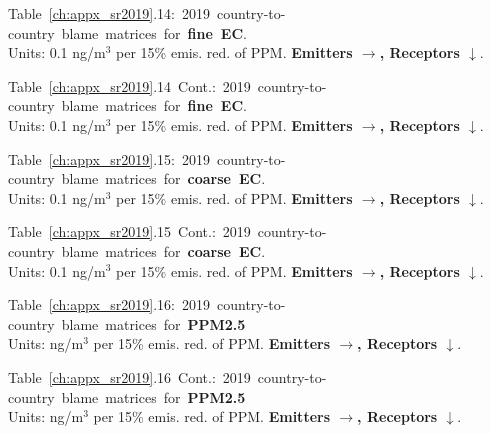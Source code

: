  \footnotesize{\mbox{Table \ref{ch:appx_sr2019}.14: 2019
     country-to-country blame matrices for \textbf{fine EC}.}\\ Units:
   0.1 ng/m$^3$ per 15\% emis. red. of PPM. \textbf{Emitters $\rightarrow$, Receptors $\downarrow$}. }\\[\baselineskip]\enlargethispage{\myenlarge} \hspace{-0.5cm} 
 \centerline{}\clearpage
 \footnotesize{\mbox{Table \ref{ch:appx_sr2019}.14 Cont.: 2019
     country-to-country blame matrices for \textbf{fine EC}.}\\ Units:
   0.1 ng/m$^3$ per 15\% emis. red. of PPM. \textbf{Emitters $\rightarrow$, Receptors $\downarrow$}. }\\[\baselineskip]\enlargethispage{\myenlarge} \hspace{-0.5cm} 
 \centerline{}\clearpage



\footnotesize{\mbox{Table \ref{ch:appx_sr2019}.15: 2019
    country-to-country blame matrices for \textbf{coarse
      EC}.}\\ Units: 0.1 ng/m$^3$ per 15\% emis. red. of PPM. \textbf{Emitters $\rightarrow$, Receptors $\downarrow$}. }\\[\baselineskip]\enlargethispage{\myenlarge} \hspace{-0.5cm} 
\centerline{}\clearpage
\footnotesize{\mbox{Table \ref{ch:appx_sr2019}.15 Cont.: 2019
    country-to-country blame matrices for \textbf{coarse
      EC}.}\\ Units: 0.1 ng/m$^3$ per 15\% emis. red. of PPM. \textbf{Emitters $\rightarrow$, Receptors $\downarrow$}. }\\[\baselineskip]\enlargethispage{\myenlarge} \hspace{-0.5cm} 
\centerline{}\clearpage



\footnotesize{\mbox{Table \ref{ch:appx_sr2019}.16: 2019 country-to-country blame matrices for \textbf{PPM2.5}}\\ Units: ng/m$^3$ per 15\% emis. red. of PPM. \textbf{Emitters $\rightarrow$, Receptors $\downarrow$}. }\\[\baselineskip]\enlargethispage{\myenlarge} \hspace{-0.5cm} 
\centerline{}\clearpage
\footnotesize{\mbox{Table \ref{ch:appx_sr2019}.16 Cont.: 2019 country-to-country blame matrices for \textbf{PPM2.5}}\\ Units: ng/m$^3$ per 15\% emis. red. of PPM. \textbf{Emitters $\rightarrow$, Receptors $\downarrow$}. }\\[\baselineskip]\enlargethispage{\myenlarge} \hspace{-0.5cm} 
\centerline{}\clearpage




